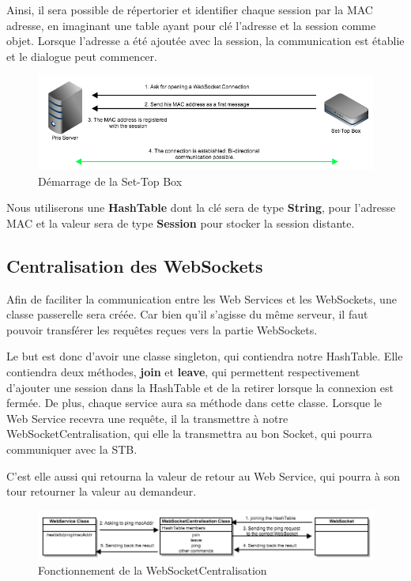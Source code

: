 \medskip

Ainsi, il sera possible de répertorier et identifier chaque session par la MAC adresse, en imaginant une table ayant pour clé l'adresse et la session comme objet. Lorsque l'adresse a été ajoutée avec la session, la communication est établie et le dialogue peut commencer.

\begin{figure}[H]
      \centering
      \includegraphics[width=\textwidth]{00_media/connection}
      \caption{Démarrage de la Set-Top Box}
      \label{gra:maqmenu}
\end{figure}

\medskip

Nous utiliserons une \textbf{HashTable} dont la clé sera de type \textbf{String}, pour l'adresse MAC et la valeur sera de type \textbf{Session} pour stocker la session distante.
\subsection{Centralisation des WebSockets}
Afin de faciliter la communication entre les Web Services et les WebSockets, une classe passerelle sera créée. Car bien qu'il s'agisse du même serveur, il faut pouvoir transférer les requêtes reçues vers la partie WebSockets.

\medskip

Le but est donc d'avoir une classe singleton, qui contiendra notre HashTable. Elle contiendra deux méthodes, \textbf{join} et \textbf{leave}, qui permettent respectivement d'ajouter une session dans la HashTable et de la retirer lorsque la connexion est fermée. De plus, chaque service aura sa méthode dans cette classe. Lorsque le Web Service recevra une requête, il la transmettre à notre WebSocketCentralisation, qui elle la transmettra au bon Socket, qui pourra communiquer avec la STB.

\medskip

C'est elle aussi qui retourna la valeur de retour au Web Service, qui pourra à son tour retourner la valeur au demandeur.

\begin{figure}[H]
      \centering
      \includegraphics[width=\textwidth]{00_media/websocketCentr}
      \caption{Fonctionnement de la WebSocketCentralisation}
      \label{gra:maqmenu}
\end{figure}

